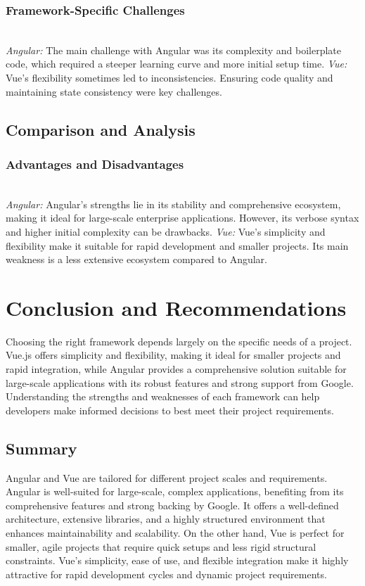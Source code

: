 \documentclass[conference]{IEEEtran}
\begin{document}
\subsubsection{Framework-Specific Challenges}
\textit{\\Angular: }The main challenge with Angular was its complexity and boilerplate code, which required a steeper learning curve and more initial setup time.
\newline\textit{Vue: }Vue's flexibility sometimes led to inconsistencies. Ensuring code quality and maintaining state consistency were key challenges.

\subsection{Comparison and Analysis}
\subsubsection{Advantages and Disadvantages}
\textit{\\Angular: }Angular's strengths lie in its stability and comprehensive ecosystem, making it ideal for large-scale enterprise applications. However, its verbose syntax and higher initial complexity can be drawbacks.
\newline\textit{Vue: }Vue's simplicity and flexibility make it suitable for rapid development and smaller projects. Its main weakness is a less extensive ecosystem compared to Angular.

\section{Conclusion and Recommendations}
Choosing the right framework depends largely on the specific needs of a project. Vue.js offers simplicity and flexibility, making it ideal for smaller projects and rapid integration, while Angular provides a comprehensive solution suitable for large-scale applications with its robust features and strong support from Google. Understanding the strengths and weaknesses of each framework can help developers make informed decisions to best meet their project requirements.

\subsection{Summary}
Angular and Vue are tailored for different project scales and requirements. Angular is well-suited for large-scale, complex applications, benefiting from its comprehensive features and strong backing by Google. It offers a well-defined architecture, extensive libraries, and a highly structured environment that enhances maintainability and scalability. On the other hand, Vue is perfect for smaller, agile projects that require quick setups and less rigid structural constraints. Vue’s simplicity, ease of use, and flexible integration make it highly attractive for rapid development cycles and dynamic project requirements.
\end{document}

